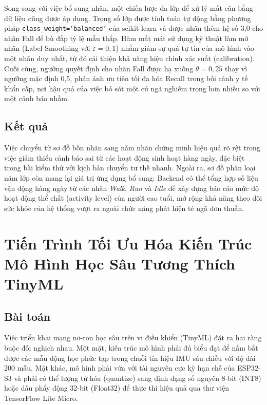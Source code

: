\documentclass[../DoAn.tex]{subfiles}
\begin{document}
Song song với việc bổ sung nhãn, một chiến lược đa lớp để xử lý mất cân bằng dữ liệu cũng được áp dụng. Trọng số lớp được tính toán tự động bằng phương pháp \texttt{class\_weight=`balanced'} của scikit-learn và được nhân thêm hệ số 3,0 cho nhãn Fall để bù đắp tỷ lệ mẫu thấp. Hàm mất mát sử dụng kỹ thuật làm mờ nhãn (Label Smoothing với $\varepsilon = 0{,}1$) nhằm giảm sự quá tự tin của mô hình vào một nhãn duy nhất, từ đó cải thiện khả năng hiệu chỉnh xác suất (calibration). Cuối cùng, ngưỡng quyết định cho nhãn Fall được hạ xuống $\theta = 0{,}25$ thay vì ngưỡng mặc định 0,5, phản ánh ưu tiên tối đa hóa Recall trong bối cảnh y tế khẩn cấp, nơi hậu quả của việc bỏ sót một cú ngã nghiêm trọng hơn nhiều so với một cảnh báo nhầm.

\subsection{Kết quả}

Việc chuyển từ sơ đồ bốn nhãn sang năm nhãn chứng minh hiệu quả rõ rệt trong việc giảm thiểu cảnh báo sai từ các hoạt động sinh hoạt hàng ngày, đặc biệt trong bài kiểm thử với kịch bản chuyển tư thế nhanh. Ngoài ra, sơ đồ phân loại năm lớp còn mang lại giá trị ứng dụng bổ sung: Backend có thể tổng hợp số liệu vận động hàng ngày từ các nhãn \textit{Walk}, \textit{Run} và \textit{Idle} để xây dựng báo cáo mức độ hoạt động thể chất (activity level) của người cao tuổi, mở rộng khả năng theo dõi sức khỏe của hệ thống vượt ra ngoài chức năng phát hiện té ngã đơn thuần.


\section{Tiến Trình Tối Ưu Hóa Kiến Trúc Mô Hình Học Sâu Tương Thích TinyML}

\subsection{Bài toán}

Việc triển khai mạng nơ-ron học sâu trên vi điều khiển (TinyML) đặt ra hai ràng buộc đối nghịch nhau. Một mặt, kiến trúc mô hình phải đủ biểu đạt để nắm bắt được các mẫu động học phức tạp trong chuỗi tín hiệu IMU sáu chiều với độ dài 200 mẫu. Mặt khác, mô hình phải vừa với tài nguyên cực kỳ hạn chế của ESP32-S3 và phải có thể lượng tử hóa (quantize) sang định dạng số nguyên 8-bit (INT8) hoặc dấu phẩy động 32-bit (Float32) để thực thi hiệu quả qua thư viện TensorFlow Lite Micro.
\end{document}
